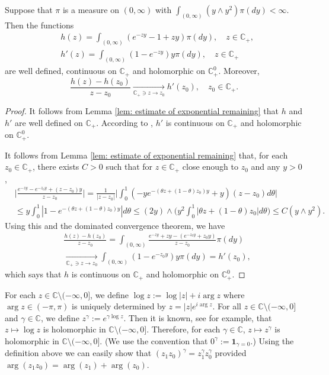 \documentclass[EJP]{ejpecp} %
\begin{document}
\begin{lemma}
  \label{lem: extension lemma for branching mechanism}
  Suppose that  $\pi$ is a measure on $(0,\infty)$ with $\int_{(0,\infty)} (y \wedge y^2) \pi(dy)< \infty$.
  Then the functions
  \begin{align}
    & h (z)
      = \int_{(0,\infty)} (e^{-zy} - 1 + zy) \pi(dy), \quad z \in \mathbb C_+, \\
    & h'(z)
      = \int_{(0,\infty)}(1- e^{-zy})y \pi(dy), \quad z \in \mathbb C_+
  \end{align}
  are well defined, continuous on $\mathbb C_+$ and holomorphic on $\mathbb C_+^0$.
  Moreover,
  \[
    \frac{h(z)-h(z_0)}{z-z_0}
    \xrightarrow[\mathbb C_+\ni z \to z_0]{} h'(z_0),\quad z_0 \in \mathbb C_+.
  \]
\end{lemma}
\begin{proof}
  It follows from Lemma \ref{lem: estimate of exponential remaining} that $h$ and $h'$ are well defined on $\mathbb C_+$.
  According to \cite[Theorems 3.2. \& Proposition 3.6]{SchillingSongVondravcek2010Bernstein}, $h'$ is continuous on $\mathbb C_+$ and holomorphic on $\mathbb C_+^0$.

  It follows from Lemma \ref{lem: estimate of exponential remaining} that, for each $z_0 \in \mathbb C_+$,  there exists $C>0$ such that for $z \in \mathbb C_+$ close enough to $z_0$ and any $y>0$,
  \begin{align}
    & \Big| \frac{e^{-zy} - e^{-z_0 y}+(z-z_0) y}{z-z_0} \Big|
      = \frac{1}{|z-z_0|}\Big| \int_0^1 (-y e^{-(\theta z+(1-\theta)z_0)y}+y)(z-z_0)d\theta\Big| \\
    & \leq y\int_0^1 |1-e^{-(\theta z +(1-\theta)z_0)y}| d\theta
      \leq (2y) \wedge\Big( y^2\int_0^1|\theta z+(1-\theta)z_0|d\theta\Big)
      \leq C(y\wedge y^2).
  \end{align}
  Using this and the dominated convergence theorem, we have
  \begin{align}
    & \frac{h(z)-h(z_0)}{z-z_0} = \int_{(0,\infty)} \frac{e^{-zy}+zy -(e^{-z_0 y}+z_0 y)}{z-z_0}  \pi(dy) \\
    & \xrightarrow[\mathbb C_+\ni z\to z_0]{} \int_{(0,\infty)}(1 - e^{-z_0 y} )y\pi(dy) = h'(z_0),
  \end{align}
  which says that $h$ is continuous on $\mathbb C_+$ and holomorphic on $\mathbb C_+^0$.
\end{proof}

For each $z\in \mathbb C\setminus (-\infty,0]$, we define $ \log z := \log |z| + i \arg z$ where $\arg z \in (-\pi,\pi)$ is uniquely determined by $ z = |z|e^{i \arg z}$. 	
For all $z\in \mathbb C\setminus (-\infty,0]$ and $\gamma \in \mathbb C$, we define $ z^\gamma := e^{\gamma \log z}. $
Then it is known, see \cite[Theorem 6.1]{SteinShakarchi2003Complex} for example, that $z\mapsto \log z$ is holomorphic in $\mathbb C\setminus (-\infty,0]$.
Therefore, for each $\gamma \in \mathbb C$, $z\mapsto z^\gamma$ is holomorphic in $\mathbb C\setminus (-\infty,0]$. (We use the convention that  $0^\gamma := \mathbf 1_{\gamma = 0}$.)
Using the definition above we can easily show that $(z_1z_0)^\gamma = z_1^\gamma z_0^\gamma$ provided $\arg (z_1z_0)=\arg (z_1) + \arg(z_0)$.
\end{document}
